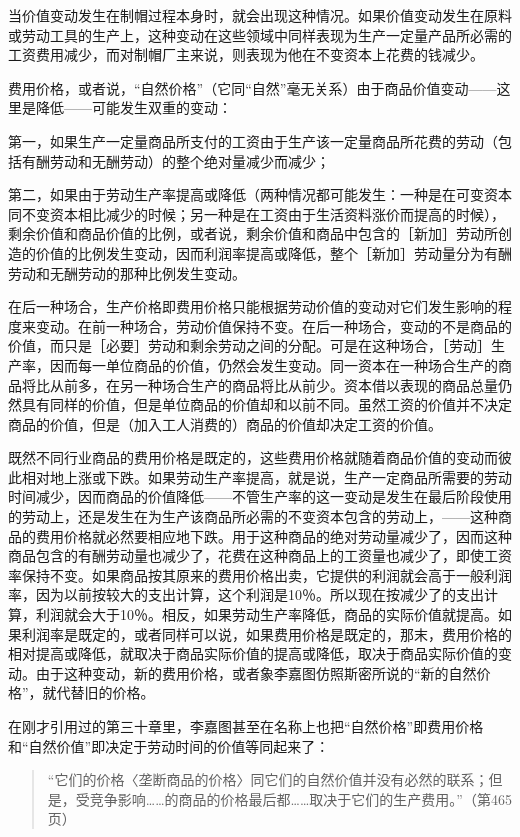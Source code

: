 当价值变动发生在制帽过程本身时，就会出现这种情况。如果价值变动发生在原料或劳动工具的生产上，这种变动在这些领域中同样表现为生产一定量产品所必需的工资费用减少，而对制帽厂主来说，则表现为他在不变资本上花费的钱减少。

费用价格，或者说，“自然价格”（它同“自然”毫无关系）由于商品价值变动——这里是降低——可能发生双重的变动：

第一，如果生产一定量商品所支付的工资由于生产该一定量商品所花费的劳动（包括有酬劳动和无酬劳动）的整个绝对量减少而减少；

第二，如果由于劳动生产率提高或降低（两种情况都可能发生：一种是在可变资本同不变资本相比减少的时候；另一种是在工资由于生活资料涨价而提高的时候），剩余价值和商品价值的比例，或者说，剩余价值和商品中包含的［新加］劳动所创造的价值的比例发生变动，因而利润率提高或降低，整个［新加］劳动量分为有酬劳动和无酬劳动的那种比例发生变动。

在后一种场合，生产价格即费用价格只能根据劳动价值的变动对它们发生影响的程度来变动。在前一种场合，劳动价值保持不变。在后一种场合，变动的不是商品的价值，而只是［必要］劳动和剩余劳动之间的分配。可是在这种场合，［劳动］生产率，因而每一单位商品的价值，仍然会发生变动。同一资本在一种场合生产的商品将比从前多，在另一种场合生产的商品将比从前少。资本借以表现的商品总量仍然具有同样的价值，但是单位商品的价值却和以前不同。虽然工资的价值并不决定商品的价值，但是（加入工人消费的）商品的价值却决定工资的价值。

既然不同行业商品的费用价格是既定的，这些费用价格就随着商品价值的变动而彼此相对地上涨或下跌。如果劳动生产率提高，就是说，生产一定商品所需要的劳动时间减少，因而商品的价值降低——不管生产率的这一变动是发生在最后阶段使用的劳动上，还是发生在为生产该商品所必需的不变资本包含的劳动上，——这种商品的费用价格就必然要相应地下跌。用于这种商品的绝对劳动量减少了，因而这种商品包含的有酬劳动量也减少了，花费在这种商品上的工资量也减少了，即使工资率保持不变。如果商品按其原来的费用价格出卖，它提供的利润就会高于一般利润率，因为以前按较大的支出计算，这个利润是10％。所以现在按减少了的支出计算，利润就会大于10％。相反，如果劳动生产率降低，商品的实际价值就提高。如果利润率是既定的，或者同样可以说，如果费用价格是既定的，那末，费用价格的相对提高或降低，就取决于商品实际价值的提高或降低，取决于商品实际价值的变动。由于这种变动，新的费用价格，或者象李嘉图仿照斯密所说的“新的自然价格”，就代替旧的价格。

在刚才引用过的第三十章里，李嘉图甚至在名称上也把“自然价格”即费用价格和“自然价值”即决定于劳动时间的价值等同起来了：

\begin{quote}{“它们的价格〈垄断商品的价格〉同它们的自然价值并没有必然的联系；但是，受竞争影响……的商品的价格最后都……取决于它们的生产费用。”（第465页）}\end{quote}

